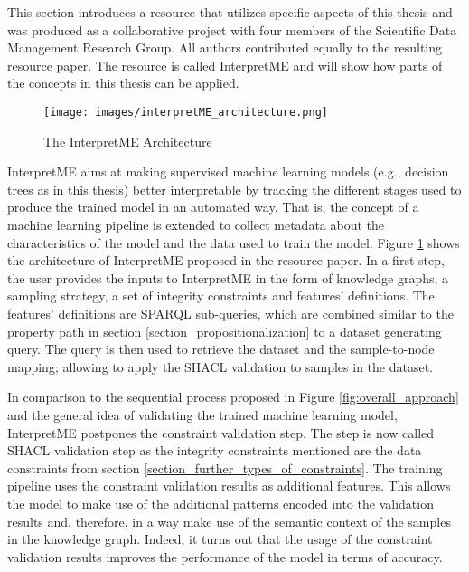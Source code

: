This section introduces a resource that utilizes specific aspects of this thesis and was produced as a collaborative project with four members of the Scientific Data Management Research Group. All authors contributed equally to the resulting resource paper. The resource is called InterpretME \cite{interpretME} and will show how parts of the concepts in this thesis can be applied.

\begin{figure}[ht]
    \centering
    \texttt{[image: images/interpretME\_architecture.png]}
    \caption{The InterpretME Architecture \cite{interpretME}}
    \label{fig:interpretMEarchitecture}
\end{figure}

InterpretME aims at making supervised machine learning models (e.g., decision trees as in this thesis) better interpretable by tracking the different stages used to produce the trained model in an automated way. That is, the concept of a machine learning pipeline is extended to collect metadata about the characteristics of the model and the data used to train the model. Figure \ref{fig:interpretMEarchitecture} shows the architecture of InterpretME proposed in the resource paper. In a first step, the user provides the inputs to InterpretME in the form of knowledge graphs, a sampling strategy, a set of integrity constraints and features' definitions. The features' definitions are SPARQL sub-queries, which are combined similar to the property path in section \ref{section_propositionalization} to a dataset generating query. The query is then used to retrieve the dataset and the sample-to-node mapping; allowing to apply the SHACL validation to samples in the dataset.  

In comparison to the sequential process proposed in Figure \ref{fig:overall_approach} and the general idea of validating the trained machine learning model, InterpretME postpones the constraint validation step. The step is now called SHACL validation step as the integrity constraints mentioned are the data constraints from section \ref{section_further_types_of_constraints}. The training pipeline uses the constraint validation results as additional features. This allows the model to make use of the additional patterns encoded into the validation results and, therefore, in a way make use of the semantic context of the samples in the knowledge graph. Indeed, it turns out that the usage of the constraint validation results improves the performance of the model in terms of accuracy. 

